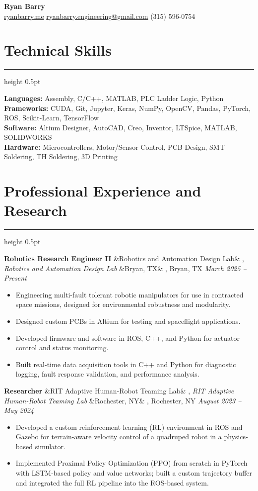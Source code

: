 \documentclass[letterpaper,10pt]{article}
\newcommand{\heading}[1]{%
    \vspace{-5mm} %
    \section*{#1}%
    \vspace{-3mm}%
    \noindent\hrule height 0.5pt %
    \vspace{4mm}%
}
\newcommand{\experience}[5]{%
    \vspace{-1mm}%
    \noindent\textbf{#1}%
    \ifx&#2&
    \else
        , \textit{#2}%
    \fi
    \ifx&#3&
    \else
        , #3%
    \fi
    \hfill \textit{#4} \\
    \vspace{-6.8mm}%
    \begin{itemize}[itemsep=-5pt]
        \setlength{\itemindent}{0em}
        #5
    \end{itemize}
}
\begin{document}
\begin{center}
    \vspace{-5mm} 
    \textbf{\huge Ryan Barry} \\
    \vspace{1mm}
    \href{http://ryanbarry.me}{ryanbarry.me}
    \hspace{0.2em} \vline \hspace{0.2em}
    \href{mailto:ryanbarry.engineering@gmail.com}{ryanbarry.engineering@gmail.com}
    \hspace{0.2em} \vline \hspace{0.2em}
    (315) 596-0754
\end{center}

\vspace{-3mm} %


\heading{Technical Skills}
\vspace{-1mm}%
\noindent\textbf{Languages:} Assembly, C/C++, MATLAB, PLC Ladder Logic, Python \\
\textbf{Frameworks:} CUDA, Git, Jupyter, Keras, NumPy, OpenCV, Pandas, PyTorch, ROS, Scikit-Learn, TensorFlow \\
\textbf{Software:} Altium Designer, AutoCAD, Creo, Inventor, LTSpice, MATLAB, SOLIDWORKS \\
\textbf{Hardware:} Microcontrollers, Motor/Sensor Control, PCB Design, SMT Soldering, TH Soldering, 3D Printing


\heading{Professional Experience and Research}

\experience
    {Robotics Research Engineer II}
    {Robotics and Automation Design Lab}
    {Bryan, TX}
    {March 2025 – Present}
    {
        \item Engineering multi-fault tolerant robotic manipulators for use in contracted space missions, designed for environmental robustness and modularity.
        \item Designed custom PCBs in Altium for testing and spaceflight applications.
        \item Developed firmware and software in ROS, C++, and Python for actuator control and status monitoring.
        \item Built real-time data acquisition tools in C++ and Python for diagnostic logging, fault response validation, and performance analysis.
    }

\experience
    {Researcher}
    {RIT Adaptive Human-Robot Teaming Lab}
    {Rochester, NY}
    {August 2023 – May 2024}
    {
        \item  Developed a custom reinforcement learning (RL) environment in ROS and Gazebo for terrain-aware velocity control of a quadruped robot in a physics-based simulator.
        \item  Implemented Proximal Policy Optimization (PPO) from scratch in PyTorch with LSTM-based policy and value networks; built a custom trajectory buffer and integrated the full RL pipeline into the ROS-based system.
    }
    
\end{document}
